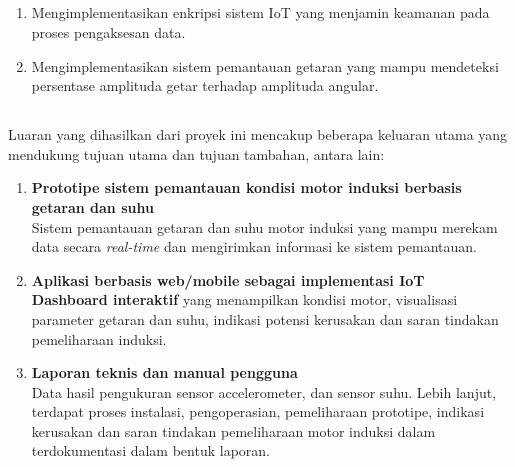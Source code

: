 \documentclass{elsinta}
\begin{document}
\subsection{\AdditionalObjectivesTitle}
\begin{enumerate} 
    \item Mengimplementasikan enkripsi sistem IoT yang menjamin keamanan pada proses pengaksesan data.
    \item Mengimplementasikan sistem pemantauan getaran yang mampu mendeteksi persentase amplituda getar terhadap amplituda angular.
\end{enumerate}

\subsection{\DeliverablesTitle}

Luaran yang dihasilkan dari proyek ini mencakup beberapa keluaran utama yang mendukung tujuan utama dan tujuan tambahan, antara lain:

\begin{enumerate}
    \item \textbf{Prototipe sistem pemantauan kondisi motor induksi berbasis getaran dan suhu} \\
    Sistem pemantauan getaran dan suhu motor induksi yang mampu merekam data secara \textit{real-time} dan mengirimkan informasi ke sistem pemantauan.
    \item \textbf{Aplikasi berbasis web/mobile sebagai implementasi IoT} \\
    \textbf{Dashboard interaktif} yang menampilkan kondisi motor, visualisasi parameter getaran dan suhu, indikasi potensi kerusakan dan saran tindakan pemeliharaan induksi.
    \item \textbf{Laporan teknis dan manual pengguna} \\
    Data hasil pengukuran sensor accelerometer, dan sensor suhu. Lebih lanjut, terdapat proses instalasi, pengoperasian, pemeliharaan prototipe, indikasi kerusakan dan saran tindakan pemeliharaan motor induksi dalam terdokumentasi dalam bentuk laporan.
\end{enumerate}
\end{document}
